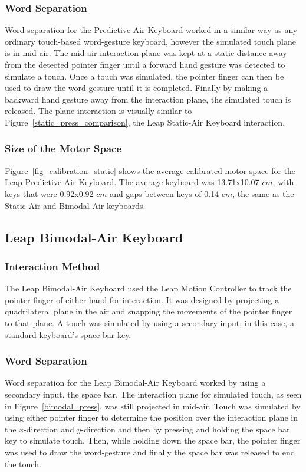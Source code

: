 \subsubsection{Word Separation}
Word separation for the Predictive-Air Keyboard worked in a similar way as any ordinary touch-based word-gesture keyboard, however the simulated touch plane is in mid-air. The mid-air interaction plane was kept at a static distance away from the detected pointer finger until a forward hand gesture was detected to simulate a touch. Once a touch was simulated, the pointer finger can then be used to draw the word-gesture until it is completed. Finally by making a backward hand gesture away from the interaction plane, the simulated touch is released. The plane interaction is visually similar to Figure~\ref{static_press_comparison}, the Leap Static-Air Keyboard interaction.

\subsubsection{Size of the Motor Space}
Figure~\ref{fig_calibration_static} shows the average calibrated motor space for the Leap Predictive-Air Keyboard. The average keyboard was 13.71x10.07 $cm$, with keys that were 0.92x0.92 $cm$ and gaps between keys of 0.14 $cm$, the same as the Static-Air and Bimodal-Air keyboards.

\subsection{Leap Bimodal-Air Keyboard}
\subsubsection{Interaction Method}
The Leap Bimodal-Air Keyboard used the Leap Motion Controller to track the pointer finger of either hand for interaction. It was designed by projecting a quadrilateral plane in the air and snapping the movements of the pointer finger to that plane. A touch was simulated by using a secondary input, in this case, a standard keyboard's space bar key.

\subsubsection{Word Separation}
Word separation for the Leap Bimodal-Air Keyboard worked by using a secondary input, the space bar. The interaction plane for simulated touch, as seen in Figure~\ref{bimodal_press}, was still projected in mid-air. Touch was simulated by using either pointer finger to determine the position over the interaction plane in the $x$-direction and $y$-direction and then by pressing and holding the space bar key to simulate touch. Then, while holding down the space bar, the pointer finger was used to draw the word-gesture and finally the space bar was released to end the touch.

